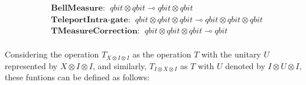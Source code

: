 \begin{align*}
   &\textbf{BellMeasure}: \hspace{5pt} \textit{qbit} \otimes \textit{qbit}  \multimap \textit{qbit} \otimes \textit{qbit} \\
   &\textbf{TeleportIntra-gate}: \hspace{5pt} \textit{qbit} \otimes \textit{qbit} \otimes \textit{qbit}  \multimap \textit{qbit} \otimes \textit{qbit} \otimes \textit{qbit} \\
   &\textbf{TMeasureCorrection}: \hspace{5pt} \textit{qbit} \otimes \textit{qbit} \otimes \textit{qbit}  \multimap \textit{qbit} \\
\end{align*}

Considering the operation $T_{X \otimes I \otimes I}$ as the operation $T$ with the unitary $U$ represented by $X \otimes I \otimes I$, and similarly, $T_{I \otimes X \otimes I}$ as $T$ with $U$ denoted by $I \otimes U \otimes I$, these funtions can be defined as follows:


